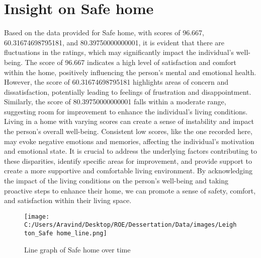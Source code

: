 \documentclass[10pt, a4paper]{article}%
\begin{document}
%
\section{Insight on Safe home}%
\label{sec:InsightonSafehome}%
Based on the data provided for Safe home, with scores of 96.667, 60.31674698795181, and 80.39750000000001, it is evident that there are fluctuations in the ratings, which may significantly impact the individual's well{-}being. The score of 96.667 indicates a high level of satisfaction and comfort within the home, positively influencing the person's mental and emotional health. However, the score of 60.31674698795181 highlights areas of concern and dissatisfaction, potentially leading to feelings of frustration and disappointment. Similarly, the score of 80.39750000000001 falls within a moderate range, suggesting room for improvement to enhance the individual's living conditions.\newline%
\newline%
Living in a home with varying scores can create a sense of instability and impact the person's overall well{-}being. Consistent low scores, like the one recorded here, may evoke negative emotions and memories, affecting the individual's motivation and emotional state. It is crucial to address the underlying factors contributing to these disparities, identify specific areas for improvement, and provide support to create a more supportive and comfortable living environment. By acknowledging the impact of the living conditions on the person's well{-}being and taking proactive steps to enhance their home, we can promote a sense of safety, comfort, and satisfaction within their living space.%


\begin{figure}[H]%
\centering%
\texttt{[image: C:/Users/Aravind/Desktop/ROE/Dessertation/Data/images/Leighton\_Safe home\_line.png]}%
\caption{Line graph of Safe home over time}%
\end{figure}

%
\end{document}

